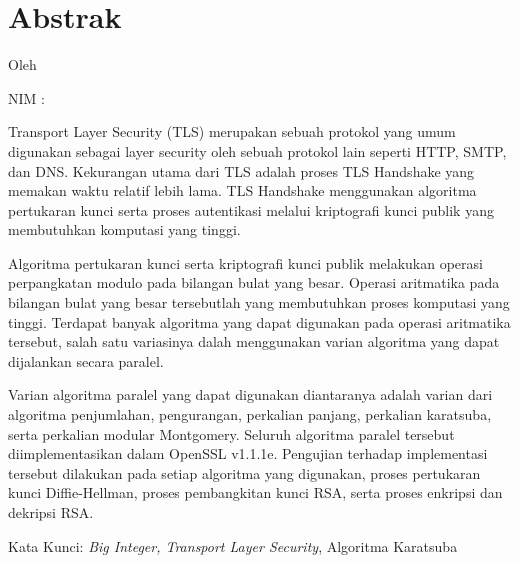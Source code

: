 \clearpage
\chapter*{Abstrak}

\begin{center}
  \large \bfseries \MakeUppercase{\thetitle}

  \normalsize \normalfont Oleh

  \theauthor

  NIM : \thestudentnumber
\end{center}


\begin{singlespacing}

Transport Layer Security (TLS) merupakan sebuah protokol yang umum digunakan sebagai layer security oleh sebuah protokol lain seperti HTTP, SMTP, dan DNS. Kekurangan utama dari TLS adalah proses TLS Handshake yang memakan waktu relatif lebih lama. TLS Handshake menggunakan algoritma pertukaran kunci serta proses autentikasi melalui kriptografi kunci publik yang membutuhkan komputasi yang tinggi.

Algoritma pertukaran kunci serta kriptografi kunci publik melakukan operasi perpangkatan modulo pada bilangan bulat yang besar. Operasi aritmatika pada bilangan bulat yang besar tersebutlah yang membutuhkan proses komputasi yang tinggi. Terdapat banyak algoritma yang dapat digunakan pada operasi aritmatika tersebut, salah satu variasinya dalah menggunakan varian algoritma yang dapat dijalankan secara paralel.

Varian algoritma paralel yang dapat digunakan diantaranya adalah varian dari algoritma penjumlahan, pengurangan, perkalian panjang, perkalian karatsuba, serta perkalian modular Montgomery. Seluruh algoritma paralel tersebut diimplementasikan dalam OpenSSL v1.1.1e. Pengujian terhadap implementasi tersebut dilakukan pada setiap algoritma yang digunakan, proses pertukaran kunci Diffie-Hellman, proses pembangkitan kunci RSA, serta proses enkripsi dan dekripsi RSA.


\end{singlespacing}


Kata Kunci: \textit{Big Integer, Transport Layer Security}, Algoritma Karatsuba
